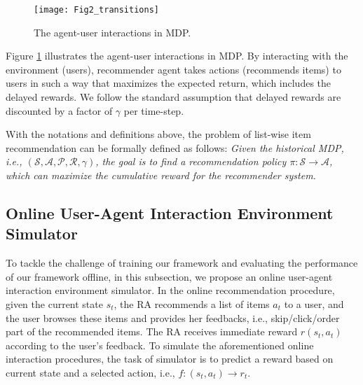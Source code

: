 \begin{figure}[H]
	\centering
	\texttt{[image: Fig2\_transitions]}
	\caption{The agent-user interactions in MDP.}
	\label{fig:interaction}
\end{figure}

Figure \ref{fig:interaction} illustrates the agent-user interactions in MDP. By interacting with the environment (users), recommender agent takes actions (recommends items) to users in such a way that maximizes the expected return, which includes the delayed rewards. We follow the standard assumption that delayed rewards are discounted by a factor of $\gamma$ per time-step.

With the notations and definitions above, the problem of list-wise item recommendation can be formally defined as follows: \textit{Given the historical MDP, i.e., $(\mathcal{S}, \mathcal{A}, \mathcal{P}, \mathcal{R}, \gamma)$, the goal is to find a recommendation policy $\pi:\mathcal{S} \rightarrow \mathcal{A}$, which can  maximize the cumulative reward for the recommender system.}

\subsection{Online User-Agent Interaction Environment Simulator}
\label{sec:simulator}
To tackle the challenge of training our framework and evaluating the performance of our framework offline, in this subsection, we propose an online user-agent interaction environment simulator. In the online recommendation procedure, given the current state $s_t$, the RA recommends a list of items $a_t$ to a user, and the user browses these items and provides her feedbacks, i.e., skip/click/order part of the recommended items. The RA receives immediate reward $r(s_t,a_t)$ according to the user's feedback. To simulate the aforementioned online interaction procedures, the task of simulator is to predict a reward based on current state and a selected action, i.e., $f: (s_t,a_t) \rightarrow r_t$. 

